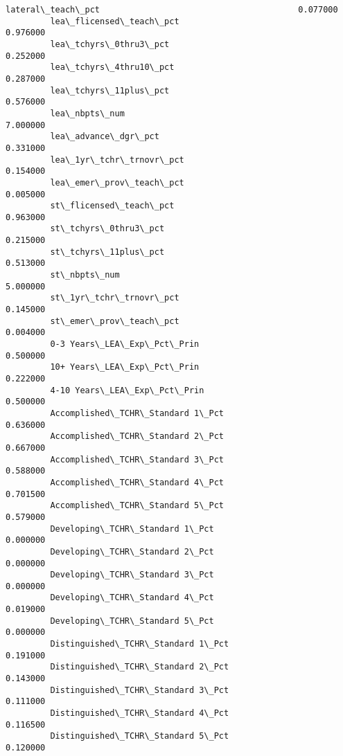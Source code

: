\documentclass[11pt]{article}
\begin{document}
\begin{Verbatim}[commandchars=\\\{\}]
         lateral\_teach\_pct                                        0.077000   
         lea\_flicensed\_teach\_pct                                  0.976000   
         lea\_tchyrs\_0thru3\_pct                                    0.252000   
         lea\_tchyrs\_4thru10\_pct                                   0.287000   
         lea\_tchyrs\_11plus\_pct                                    0.576000   
         lea\_nbpts\_num                                            7.000000   
         lea\_advance\_dgr\_pct                                      0.331000   
         lea\_1yr\_tchr\_trnovr\_pct                                  0.154000   
         lea\_emer\_prov\_teach\_pct                                  0.005000   
         st\_flicensed\_teach\_pct                                   0.963000   
         st\_tchyrs\_0thru3\_pct                                     0.215000   
         st\_tchyrs\_11plus\_pct                                     0.513000   
         st\_nbpts\_num                                             5.000000   
         st\_1yr\_tchr\_trnovr\_pct                                   0.145000   
         st\_emer\_prov\_teach\_pct                                   0.004000   
         0-3 Years\_LEA\_Exp\_Pct\_Prin                               0.500000   
         10+ Years\_LEA\_Exp\_Pct\_Prin                               0.222000   
         4-10 Years\_LEA\_Exp\_Pct\_Prin                              0.500000   
         Accomplished\_TCHR\_Standard 1\_Pct                         0.636000   
         Accomplished\_TCHR\_Standard 2\_Pct                         0.667000   
         Accomplished\_TCHR\_Standard 3\_Pct                         0.588000   
         Accomplished\_TCHR\_Standard 4\_Pct                         0.701500   
         Accomplished\_TCHR\_Standard 5\_Pct                         0.579000   
         Developing\_TCHR\_Standard 1\_Pct                           0.000000   
         Developing\_TCHR\_Standard 2\_Pct                           0.000000   
         Developing\_TCHR\_Standard 3\_Pct                           0.000000   
         Developing\_TCHR\_Standard 4\_Pct                           0.019000   
         Developing\_TCHR\_Standard 5\_Pct                           0.000000   
         Distinguished\_TCHR\_Standard 1\_Pct                        0.191000   
         Distinguished\_TCHR\_Standard 2\_Pct                        0.143000   
         Distinguished\_TCHR\_Standard 3\_Pct                        0.111000   
         Distinguished\_TCHR\_Standard 4\_Pct                        0.116500   
         Distinguished\_TCHR\_Standard 5\_Pct                        0.120000   

\end{Verbatim}
\end{document}
